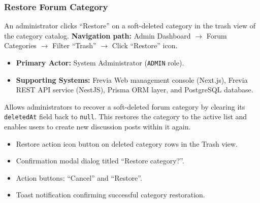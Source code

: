 \subsubsection{ Restore Forum Category}

An administrator clicks ``Restore'' on a soft-deleted category in the trash view of the category catalog.\newline
\textbf{Navigation path:} Admin Dashboard $\rightarrow$ Forum Categories $\rightarrow$ Filter ``Trash'' $\rightarrow$ Click ``Restore'' icon.


\begin{itemize}[leftmargin=1.6em,topsep=3pt,itemsep=2pt,parsep=0pt,label=$\bullet$]
    \item \textbf{Primary Actor:} System Administrator (\texttt{ADMIN} role).
    \item \textbf{Supporting Systems:} Frevia Web management console (Next.js), Frevia REST API service (NestJS), Prisma ORM layer, and PostgreSQL database.
\end{itemize}

\noindent Allows administrators to recover a soft-deleted forum category by clearing its \texttt{deletedAt} field back to \texttt{null}. This restores the category to the active list and enables users to create new discussion posts within it again.

\begin{itemize}[leftmargin=1.6em,topsep=3pt,itemsep=2pt,parsep=0pt,label=$\bullet$]
    \item Restore action icon button on deleted category rows in the Trash view.
    \item Confirmation modal dialog titled ``Restore category?''.
    \item Action buttons: ``Cancel'' and ``Restore''.
    \item Toast notification confirming successful category restoration.
\end{itemize}

